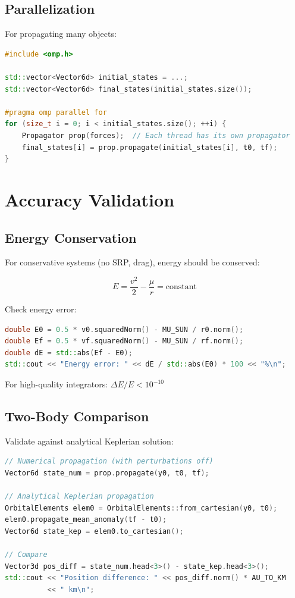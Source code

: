 \subsection{Parallelization}

For propagating many objects:

\begin{lstlisting}[language=C++,caption={Parallel propagation}]
#include <omp.h>

std::vector<Vector6d> initial_states = ...;
std::vector<Vector6d> final_states(initial_states.size());

#pragma omp parallel for
for (size_t i = 0; i < initial_states.size(); ++i) {
    Propagator prop(forces);  // Each thread has its own propagator
    final_states[i] = prop.propagate(initial_states[i], t0, tf);
}
\end{lstlisting}

\section{Accuracy Validation}

\subsection{Energy Conservation}

For conservative systems (no SRP, drag), energy should be conserved:

\begin{equation}
    E = \frac{v^2}{2} - \frac{\mu}{r} = \text{constant}
\end{equation}

Check energy error:
\begin{lstlisting}[language=C++,caption={Energy check}]
double E0 = 0.5 * v0.squaredNorm() - MU_SUN / r0.norm();
double Ef = 0.5 * vf.squaredNorm() - MU_SUN / rf.norm();
double dE = std::abs(Ef - E0);
std::cout << "Energy error: " << dE / std::abs(E0) * 100 << "%\n";
\end{lstlisting}

For high-quality integrators: $\Delta E / E < 10^{-10}$

\subsection{Two-Body Comparison}

Validate against analytical Keplerian solution:

\begin{lstlisting}[language=C++,caption={Keplerian comparison}]
// Numerical propagation (with perturbations off)
Vector6d state_num = prop.propagate(y0, t0, tf);

// Analytical Keplerian propagation
OrbitalElements elem0 = OrbitalElements::from_cartesian(y0, t0);
elem0.propagate_mean_anomaly(tf - t0);
Vector6d state_kep = elem0.to_cartesian();

// Compare
Vector3d pos_diff = state_num.head<3>() - state_kep.head<3>();
std::cout << "Position difference: " << pos_diff.norm() * AU_TO_KM 
          << " km\n";
\end{lstlisting}

